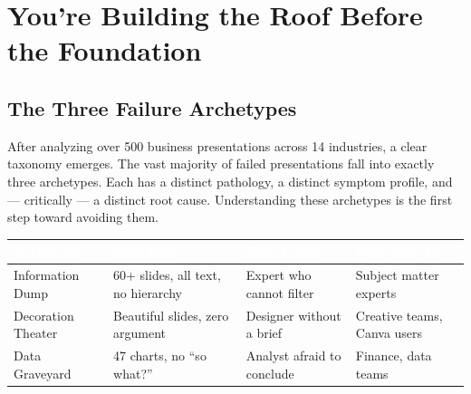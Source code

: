 
\section{You're Building the Roof Before the Foundation}


\subsection{The Three Failure Archetypes}

After analyzing over 500 business presentations across 14 industries, a clear taxonomy emerges. The vast majority of failed presentations fall into exactly three archetypes. Each has a distinct pathology, a distinct symptom profile, and --- critically --- a distinct root cause. Understanding these archetypes is the first step toward avoiding them.

\begin{center}
\begin{tabularx}{\textwidth}{>{\raggedright}p{3.2cm} >{\raggedright}p{3.8cm} >{\raggedright}p{3.5cm} >{\raggedright\arraybackslash}p{3cm}}
\toprule
\rowcolor{tableheader} \textcolor{white}{\textbf{Archetype}} & \textcolor{white}{\textbf{Symptom}} & \textcolor{white}{\textbf{Root Cause}} & \textcolor{white}{\textbf{Who Falls In}} \\
\midrule
Information Dump & 60+ slides, all text, no hierarchy & Expert who cannot filter & Subject matter experts \\
\rowcolor{altrow}
Decoration Theater & Beautiful slides, zero argument & Designer without a brief & Creative teams, Canva users \\
Data Graveyard & 47 charts, no ``so what?'' & Analyst afraid to conclude & Finance, data teams \\
\bottomrule
\end{tabularx}
\end{center}


